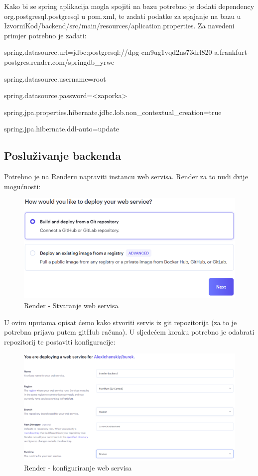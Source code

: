 Kako bi se spring aplikacija mogla spojiti na bazu potrebno je dodati 
dependency org.postgresql.postgresql u pom.xml, te zadati podatke za spajanje 
na bazu u IzvorniKod/backend/src/main/resources/aplication.properties. Za 
navedeni primjer potrebno je zadati:

spring.datasource.url=jdbc:postgresql://dpg-cm9ug1vqd2ns73drl820-a.frankfurt-postgres.render.com/springdb_yrwe

spring.datasource.username=root

spring.datasource.password=<zaporka>

spring.jpa.properties.hibernate.jdbc.lob.non_contextual_creation=true

spring.jpa.hibernate.ddl-auto=update

\subsection{Posluživanje backenda}

Potrebno je na Renderu napraviti instancu web servisa. Render za to nudi dvije 
mogućnosti:

\begin{figure}[H]
	\includegraphics[scale=0.4]{slike/render_backend.png}
	\centering
	\caption{Render - Stvaranje web servisa}
	\label{fig:render_backend1}
\end{figure}

U ovim uputama opisat ćemo kako stvoriti servis iz git repozitorija (za to je 
potrebna prijava putem gitHub računa). U sljedećem koraku potrebno je odabrati 
repozitorij te postaviti konfiguracije:

\begin{figure}[H]
	\includegraphics[scale=0.4]{slike/render_backend1.png}
	\centering
	\caption{Render - konfiguriranje web servisa}
	\label{fig:render_backend2}
\end{figure}

